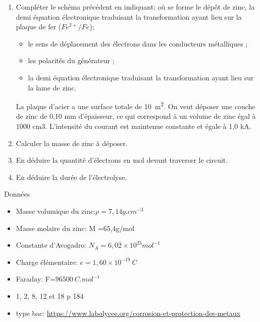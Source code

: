 \begin{enumerate}
\item Compléter le schéma précédent en indiquant: où se forme le dépôt de zinc, la demi équation électronique traduisant la transformation ayant lieu sur la plaque de fer ($Fe^{2+}/Fe$);
\begin{itemize}
\item le sens de déplacement des électrons dans les conducteurs métalliques ;
\item les polarités du générateur ;
\item la demi équation électronique traduisant la transformation ayant lieu sur la lame de zinc.
\end{itemize}
La plaque d'acier a une surface totale de \SI{10}{m^2}. On veut déposer une couche de zinc de 0,10 mm
d'épaisseur, ce qui correspond à un volume de zinc égal à 1000 cm3. L'intensité du courant est maintenue
constante et égale à 1,0 kA.
\item  Calculer la masse de zinc à déposer.
\item En déduire la quantité d'électrons en mol devant traverser le circuit.
\item En déduire la durée de l'électrolyse.
\end{enumerate}
Données
\begin{itemize}
\item Masse volumique du zinc:$\rho=7,14g.cm^{-3}$
\item Masse molaire du zinc: M =65,4g/mol
\item Constante d'Avogadro: $ N_{A}=6,02\times10^{23}mol^{-1}$
\item Charge élémentaire: $e=1,60\times10^{-19}\:C$ 
\item Faraday: F=$96500\:C.mol^{-1}$
\end{itemize}

\begin{itemize}
\item 1, 2, 8, 12 et 18 p 184
\item type bac: \url{https://www.labolycee.org/corrosion-et-protection-des-metaux}
\end{itemize}